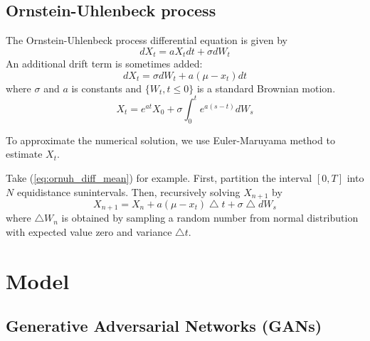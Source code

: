 \documentclass{article}
\begin{document}
			
				
				
	
	\subsection{Ornstein-Uhlenbeck process}
	The Ornstein-Uhlenbeck process differential equation is given by
	\begin{equation}
		dX_t = aX_tdt + \sigma dW_t 
		\label{eq:ornuh_diff}
	\end{equation}
	An additional drift term is sometimes added:
	\begin{equation}
	dX_t = \sigma dW_t +a (\mu-x_t)dt
	\label{eq:ornuh_diff_mean}
	\end{equation}
	where $\sigma$ and $a$ is constants and $\{W_t, t \leq 0\}$ is a standard Brownian motion.
	\begin{equation}
		X_t = e^{at}X_0 + \sigma \int_{0}^{t}e^{a(s-t)}dW_s
			\end{equation}
	
	To approximate the numerical solution, we use Euler-Maruyama method to estimate $X_t$.
	
	Take (\ref{eq:ornuh_diff_mean}) for example. 
	First, partition the interval $[0,T]$ into $N$ equidistance sunintervals. 
	Then, recursively solving $X_{n+1}$ by
	\begin{equation}
		X_{n+1} = X_{n} + a (\mu-x_t) \bigtriangleup t+ \sigma \bigtriangleup dW_s
	\end{equation}
	where $\bigtriangleup W_n$ is obtained by sampling a random number from normal distribution with expected value zero and variance $\bigtriangleup t$.
	
	
	
	
	
	
	\section{Model}
	\subsection{Generative Adversarial Networks (GANs)}
	
\end{document}
